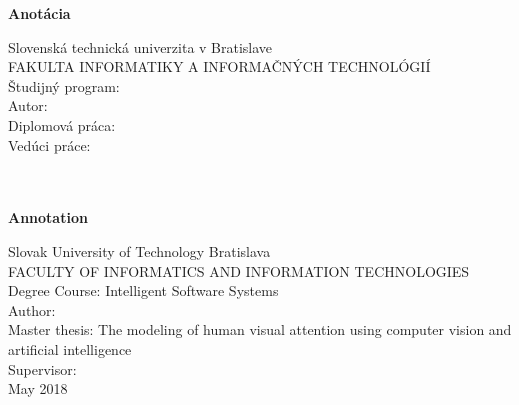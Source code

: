 \newpage
\cleardoublepage
\thispagestyle{plain}
\begin{center}
\begin{Large}
\textbf{Anotácia} \\
\end{Large}
\end{center}
Slovenská technická univerzita v Bratislave \\
FAKULTA INFORMATIKY A INFORMAČNÝCH TECHNOLÓGIÍ \\
\noindent
Študijný program: \Program \\
\noindent
Autor: \Author \\
{Diplomová práca: }\Title \\
Vedúci práce: \Supervisor \\
\Month\ \Year \\
\noindent
\\



\newpage
\cleardoublepage
\thispagestyle{plain}
\begin{center}
\begin{Large}
\textbf{Annotation} \\
\end{Large}
\end{center}
Slovak University of Technology Bratislava \\
FACULTY OF INFORMATICS AND INFORMATION TECHNOLOGIES \\
\noindent
Degree Course: Intelligent Software Systems \\
\noindent
Author: \Author \\
{Master thesis: } The modeling of human visual attention using computer vision and artificial intelligence \\
Supervisor: \Supervisor \\
May 2018 \\
\noindent
\\

